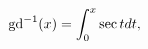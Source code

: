 \[\mathop{{\mathrm{gd}^{-1}}\/}\nolimits\!\left(x\right)=\int_{0}^{x}\mathop{%
\sec\/}\nolimits tdt,\]